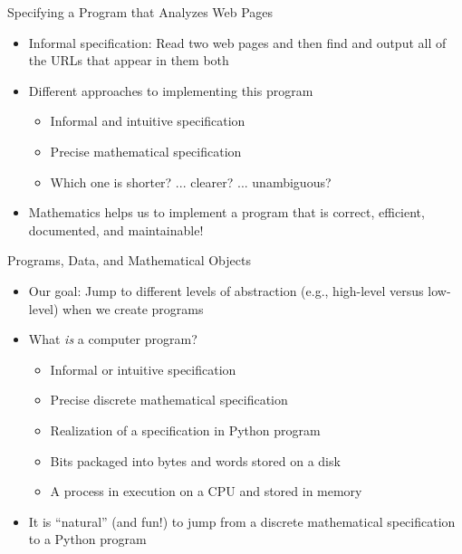 \documentclass[14pt,aspectratio=169]{beamer}
\begin{document}
%
\begin{frame}{Specifying a Program that Analyzes Web Pages}
  \begin{itemize}
    \item Informal specification: Read two web pages and then find and output
      all of the URLs that appear in them both
    \item Different approaches to implementing this program
      \begin{itemize}
        \item Informal and intuitive specification
        \item Precise mathematical specification
        \item Which one is shorter? ... clearer? ... unambiguous?
      \end{itemize}
    \item Mathematics helps us to implement a program that is correct,
      efficient, documented, and maintainable!
  \end{itemize}
\end{frame}

%
\begin{frame}{Programs, Data, and Mathematical Objects}
  \begin{itemize}
    \item Our goal: Jump to different levels of abstraction (e.g., high-level
      versus low-level) when we create programs
      \vspace*{-.2in}
    \item What {\em is} a computer program?
      \begin{itemize}
        \item Informal or intuitive specification
        \item Precise discrete mathematical specification
        \item Realization of a specification in Python program
        \item Bits packaged into bytes and words stored on a disk
        \item A process in execution on a CPU and stored in memory
      \end{itemize}
      \vspace*{-.2in}
    \item It is ``natural'' (and fun!) to jump from a discrete mathematical
      specification to a Python program
  \end{itemize}
\end{frame}
\end{document}
